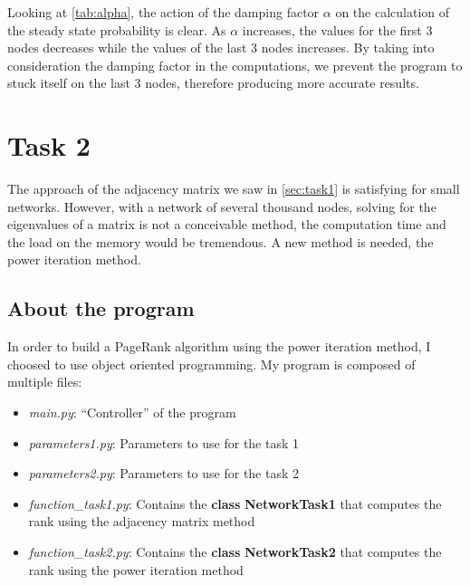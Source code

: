 Looking at \autoref{tab:alpha}, the action of the damping factor $\alpha$ on the calculation of the steady state probability is clear. As $\alpha$ increases, the values for the first 3 nodes decreases while the values of the last 3 nodes increases. By taking into consideration the damping factor in the computations, we prevent the program to stuck itself on the last 3 nodes, therefore producing more accurate results.
\section{Task 2}
The approach of the adjacency matrix we saw in \autoref{sec:task1} is satisfying for small networks. However, with a network of several thousand nodes, solving for the eigenvalues of a matrix is not a conceivable method, the computation time and the load on the memory would be tremendous. A new method is needed, the power iteration method.

\subsection{About the program}
    In order to build a PageRank algorithm using the power iteration method, I choosed to use object oriented programming. My program is composed of multiple files:
    \begin{itemize}
        \item \textit{main.py}: ``Controller'' of the program
        \item \textit{parameters1.py}: Parameters to use for the task 1
        \item \textit{parameters2.py}: Parameters to use for the task 2
        \item \textit{function\_task1.py}: Contains the \textbf{class} \textbf{NetworkTask1} that computes the rank using the adjacency matrix method
        \item \textit{function\_task2.py}: Contains the \textbf{class} \textbf{NetworkTask2} that computes the rank using the power iteration method
    \end{itemize}

